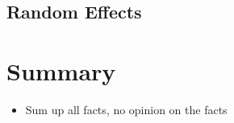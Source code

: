 \subsection{Random Effects}
\begin{table}[h]
\centering
\label{tab:reg-random}
\caption[Summary of random effects from the experimental model]{Summary of random effects from the experimental model.}
\end{table}

\section{Summary} \label{sec:stats_summary}
\begin{itemize}
\item Sum up all facts, no opinion on the facts
\end{itemize}
